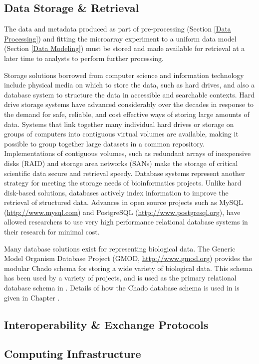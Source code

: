 \subsection{Data Storage \& Retrieval}
\label{Storage}

The data and metadata produced as part of pre-processing (Section \ref{Data
Processing}) and fitting the microarray experiment to a uniform data model
(Section \ref{Data Modeling}) must be stored and made available for retrieval
at a later time to analysts to perform further processing.

Storage solutions borrowed from computer science and information technology
include physical media on which to store the data, such as hard drives, and
also a database system to structure the data in accessible and searchable
contexts.  Hard drive storage systems have advanced considerably over the
decades in response to the demand for safe, reliable, and cost effective ways
of storing large amounts of data.  Systems that link together many individual
hard drives or storage on groups of computers into contiguous virtual volumes
are available, making it possible to group together large datasets in a common
repository.  Implementations of contiguous volumes, such as redundant arrays of
inexpensive disks (RAID) and storage area networks (SANs) make the storage of
critical scientific data secure and retrieval speedy.  Database systems
represent another strategy for meeting the storage needs of bioinformatics
projects.  Unlike hard disk-based solutions, databases actively index
information to improve the retrieval of structured data.  Advances in open
source projects such as MySQL (\url{http://www.mysql.com}) and PostgreSQL
(\url{http://www.postgresql.org}), have allowed researchers to use very high
performance relational database systems in their research for minimal cost.

Many database solutions exist for representing biological data.  The Generic
Model Organism Database Project (GMOD, \url{http://www.gmod.org}) provides the
modular Chado schema \cite{chado} for storing a wide variety of biological
data.  This schema has been used by a variety of projects, and is used as the
primary relational database schema in \dbthesis.  Details of how the Chado
database schema is used in \dbthesis is given in Chapter \dbthesis.

\subsection{Interoperability \& Exchange Protocols}
\label{Protocol}

\subsection{Computing Infrastructure}
\label{Infrastructure}
